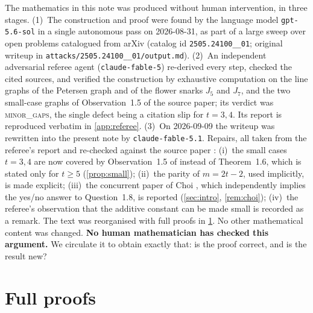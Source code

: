 \documentclass[11pt,a4paper]{article}
\theoremstyle{plain}
\theoremstyle{definition}
\theoremstyle{remark}
\begin{document}
The mathematics in this note was produced without human intervention, in three stages.
(1)~The construction and proof were found by the language model \texttt{gpt-5.6-sol} in a single autonomous pass on 2026-08-31, as part of a large sweep over open problems catalogued from arXiv (catalog id \texttt{2505.24100\_\_01}; original writeup in \texttt{attacks/2505.24100\_\_01/output.md}).
(2)~An independent adversarial referee agent (\texttt{claude-fable-5}) re-derived every step, checked the cited sources, and verified the construction by exhaustive computation on the line graphs of the Petersen graph and of the flower snarks $J_5$ and $J_7$, and the two small-case graphs of Observation~1.5 of the source paper; its verdict was \textsc{minor\_gaps}, the single defect being a citation slip for $t=3,4$. Its report is reproduced verbatim in \cref{app:referee}.
(3)~On 2026-09-09 the writeup was rewritten into the present note by \texttt{claude-fable-5.1}. Repairs, all taken from the referee's report and re-checked against the source paper \cite{FHHS25}: (i)~the small cases $t=3,4$ are now covered by Observation~1.5 of \cite{FHHS25} instead of Theorem~1.6, which is stated only for $t\ge5$ (\cref{prop:small}); (ii)~the parity of $m=2t-2$, used implicitly, is made explicit; (iii)~the concurrent paper of Choi \cite{Choi26}, which independently implies the yes/no answer to Question~1.8, is reported (\cref{sec:intro}, \cref{rem:choi}); (iv)~the referee's observation that the additive constant can be made small is recorded as a remark. The text was reorganised with full proofs in \cref{app:proofs}. No other mathematical content was changed.
\textbf{No human mathematician has checked this argument.} We circulate it to obtain exactly that: is the proof correct, and is the result new?


\appendix

\section{Full proofs}\label{app:proofs}
\end{document}
